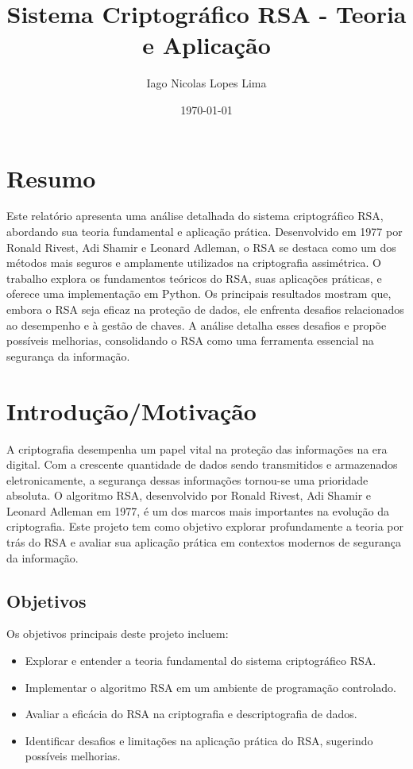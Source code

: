 \documentclass[a4paper,12pt]{article}
\title{Sistema Criptográfico RSA - Teoria e Aplicação}
\author{Iago Nicolas Lopes Lima}
\date{\today}
\begin{document}
\maketitle

\section*{Resumo}
Este relatório apresenta uma análise detalhada do sistema criptográfico RSA, abordando sua teoria fundamental e aplicação prática. Desenvolvido em 1977 por Ronald Rivest, Adi Shamir e Leonard Adleman, o RSA se destaca como um dos métodos mais seguros e amplamente utilizados na criptografia assimétrica. O trabalho explora os fundamentos teóricos do RSA, suas aplicações práticas, e oferece uma implementação em Python. Os principais resultados mostram que, embora o RSA seja eficaz na proteção de dados, ele enfrenta desafios relacionados ao desempenho e à gestão de chaves. A análise detalha esses desafios e propõe possíveis melhorias, consolidando o RSA como uma ferramenta essencial na segurança da informação.

\section*{Introdução/Motivação}
A criptografia desempenha um papel vital na proteção das informações na era digital. Com a crescente quantidade de dados sendo transmitidos e armazenados eletronicamente, a segurança dessas informações tornou-se uma prioridade absoluta. O algoritmo RSA, desenvolvido por Ronald Rivest, Adi Shamir e Leonard Adleman em 1977, é um dos marcos mais importantes na evolução da criptografia. Este projeto tem como objetivo explorar profundamente a teoria por trás do RSA e avaliar sua aplicação prática em contextos modernos de segurança da informação.

\subsection*{Objetivos}
Os objetivos principais deste projeto incluem:
\begin{itemize}
    \item Explorar e entender a teoria fundamental do sistema criptográfico RSA.
    \item Implementar o algoritmo RSA em um ambiente de programação controlado.
    \item Avaliar a eficácia do RSA na criptografia e descriptografia de dados.
    \item Identificar desafios e limitações na aplicação prática do RSA, sugerindo possíveis melhorias.
\end{itemize}
\end{document}
